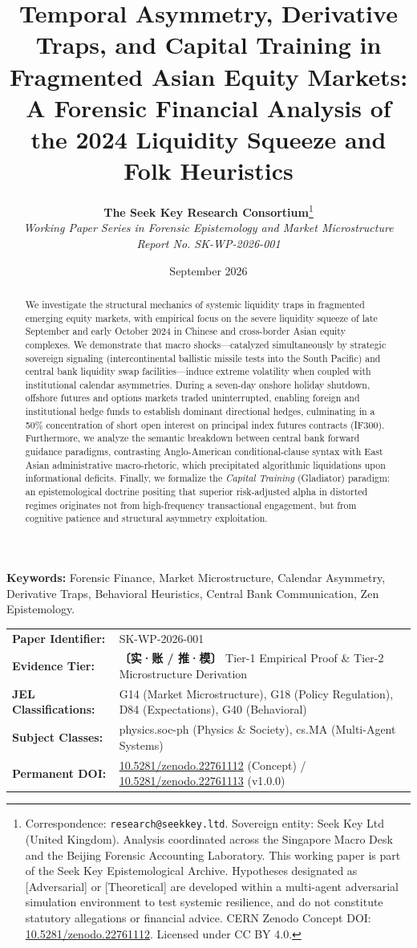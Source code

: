 \documentclass[11pt,a4paper]{article}
\title{\textbf{Temporal Asymmetry, Derivative Traps, and Capital Training in Fragmented Asian Equity Markets: \\ \large A Forensic Financial Analysis of the 2024 Liquidity Squeeze and Folk Heuristics}}
\author{
    \textbf{The Seek Key Research Consortium}\thanks{Correspondence: \texttt{research@seekkey.ltd}. Sovereign entity: Seek Key Ltd (United Kingdom). Analysis coordinated across the Singapore Macro Desk and the Beijing Forensic Accounting Laboratory. This working paper is part of the Seek Key Epistemological Archive. Hypotheses designated as [Adversarial] or [Theoretical] are developed within a multi-agent adversarial simulation environment to test systemic resilience, and do not constitute statutory allegations or financial advice. CERN Zenodo Concept DOI: \href{https://doi.org/10.5281/zenodo.22761112}{10.5281/zenodo.22761112}. Licensed under CC BY 4.0.} \\
    \textit{Working Paper Series in Forensic Epistemology and Market Microstructure} \\
    \textit{Report No. SK-WP-2026-001}
}
\date{September 2026}
\begin{document}
\maketitle

\begin{abstract}
We investigate the structural mechanics of systemic liquidity traps in fragmented emerging equity markets, with empirical focus on the severe liquidity squeeze of late September and early October 2024 in Chinese and cross-border Asian equity complexes. We demonstrate that macro shocks—catalyzed simultaneously by strategic sovereign signaling (intercontinental ballistic missile tests into the South Pacific) and central bank liquidity swap facilities—induce extreme volatility when coupled with institutional calendar asymmetries. During a seven-day onshore holiday shutdown, offshore futures and options markets traded uninterrupted, enabling foreign and institutional hedge funds to establish dominant directional hedges, culminating in a 50\% concentration of short open interest on principal index futures contracts (IF300). Furthermore, we analyze the semantic breakdown between central bank forward guidance paradigms, contrasting Anglo-American conditional-clause syntax with East Asian administrative macro-rhetoric, which precipitated algorithmic liquidations upon informational deficits. Finally, we formalize the \textit{Capital Training} (Gladiator) paradigm: an epistemological doctrine positing that superior risk-adjusted alpha in distorted regimes originates not from high-frequency transactional engagement, but from cognitive patience and structural asymmetry exploitation.
\end{abstract}

\vspace{0.5em}
\noindent \textbf{Keywords:} Forensic Finance, Market Microstructure, Calendar Asymmetry, Derivative Traps, Behavioral Heuristics, Central Bank Communication, Zen Epistemology.

\vspace{1em}
\begin{center}
\small
\begin{tabular}{ll}
\toprule
\textbf{Paper Identifier:} & SK-WP-2026-001 \\
\textbf{Evidence Tier:} & \textbf{〔实·账 / 推·模〕} Tier-1 Empirical Proof \& Tier-2 Microstructure Derivation \\
\textbf{JEL Classifications:} & G14 (Market Microstructure), G18 (Policy Regulation), D84 (Expectations), G40 (Behavioral) \\
\textbf{Subject Classes:} & physics.soc-ph (Physics \& Society), cs.MA (Multi-Agent Systems) \\
\textbf{Permanent DOI:} & \href{https://doi.org/10.5281/zenodo.22761112}{10.5281/zenodo.22761112} (Concept) / \href{https://doi.org/10.5281/zenodo.22761113}{10.5281/zenodo.22761113} (v1.0.0) \\
\bottomrule
\end{tabular}
\end{center}
\end{document}
